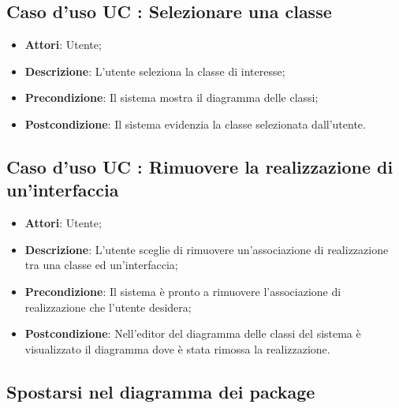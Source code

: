 \documentclass[../AnalisiDeiRequisiti.tex]{subfiles}
\begin{document}
		\subsection{Caso d'uso UC : Selezionare una classe}
			\begin{itemize}
				\item \textbf{Attori}: Utente;
				\item \textbf{Descrizione}: L'utente seleziona la classe di interesse;
				\item \textbf{Precondizione}: Il sistema mostra il diagramma delle classi;
				\item \textbf{Postcondizione}: Il sistema evidenzia la classe selezionata
				dall'utente.
			\end{itemize}
		\subsection{Caso d'uso UC : Rimuovere la realizzazione di un'interfaccia}
			\begin{itemize}
				\item \textbf{Attori}: Utente;
				\item \textbf{Descrizione}: L'utente sceglie di rimuovere un'associazione di
				realizzazione tra una classe ed un'interfaccia;
				\item \textbf{Precondizione}: Il sistema è pronto a rimuovere l'associazione
				di realizzazione che l'utente desidera;
				\item \textbf{Postcondizione}: Nell'editor del diagramma delle classi del
				sistema è visualizzato il diagramma dove è stata rimossa la realizzazione.
			\end{itemize}
			

			
		\subsection{Spostarsi nel diagramma dei package}
		
\end{document}
